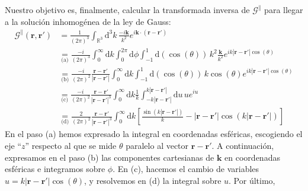 \begin{example}
    Nuestro objetivo es, finalmente, calcular la transformada inversa de \(\boldsymbol{\mathcal{G}}^\parallel\) para llegar a la solución inhomogénea de la ley de Gauss: 
    \begin{align*}
        \boldsymbol{\mathcal{G}}^\parallel(\mathbf{r}, \mathbf{r}') &= \frac{1}{(2\pi)^3} \int_{\mathbb{R}^3}\mathrm{d}^3k\, \frac{-i\mathbf{k}}{k^2}e^{i\mathbf{k}\cdot(\mathbf{r}-\mathbf{r}')}\\
        &\underset{\text{(a)}}{=} \frac{-i}{(2\pi)^3}\int_0^\infty\mathrm{d}k \int_{0}^{2\pi}\mathrm{d}\phi\int_{-1}^1\mathrm{d}(\cos(\theta))\, k^2 \frac{\mathbf{k}}{k^2}e^{ik|\mathbf{r}-\mathbf{r}'|\cos(\theta)} \\
        &\underset{\text{(b)}}{=} \frac{-i}{(2\pi)^2} \frac{\mathbf{r}-\mathbf{r}'}{|\mathbf{r}-\mathbf{r}'|} \int_0^\infty \mathrm{d}k\int_{-1}^1\mathrm{d}(\cos(\theta)) \, k\cos(\theta) e^{ik|\mathbf{r}-\mathbf{r}'|\cos(\theta)} \\
        &\underset{\text{(c)}}{=} \frac{-i}{(2\pi)^2} \frac{\mathbf{r}-\mathbf{r}'}{|\mathbf{r}-\mathbf{r}'|^3} \int_0^\infty \mathrm{d}k \frac{1}{k}\int_{-k|\mathbf{r}-\mathbf{r}'|}^{k|\mathbf{r}-\mathbf{r}'|}\mathrm{d}u \, u e^{iu} \\
        &\underset{\text{(d)}}{=} \frac{2}{(2\pi)^2} \frac{\mathbf{r}-\mathbf{r}'}{|\mathbf{r}-\mathbf{r}'|^3} \int_0^\infty \mathrm{d}k \left[\frac{\sin(k|\mathbf{r}-\mathbf{r}'|)}{k} - |\mathbf{r}-\mathbf{r}'|\cos(k|\mathbf{r}-\mathbf{r}'|)\right]
    \end{align*}
    En el paso (a) hemos expresado la integral en coordenadas esféricas, escogiendo el eje ``\(z\)'' respecto al que se mide \(\theta\) paralelo al vector \(\mathbf{r}-\mathbf{r}'\). A continuación, expresamos en el paso (b) las componentes cartesianas de \(\mathbf{k}\) en coordenadas esféricas e integramos sobre \(\phi\). En (c), hacemos el cambio de variables \(u = k|\mathbf{r}-\mathbf{r}'|\cos(\theta)\), y resolvemos en (d) la integral sobre \(u\). Por último, 

\end{example}

